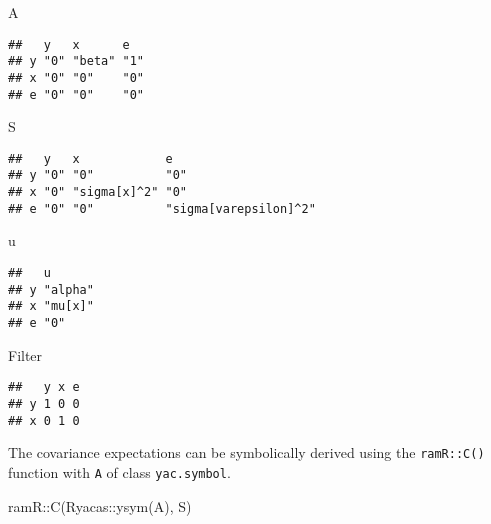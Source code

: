 \documentclass[
]{book}
\newenvironment{Shaded}{\begin{snugshade}}{\end{snugshade}}
\newcommand{\FunctionTok}[1]{\textcolor[rgb]{0.00,0.00,0.00}{#1}}
\newcommand{\NormalTok}[1]{#1}
\newcommand{\SpecialCharTok}[1]{\textcolor[rgb]{0.00,0.00,0.00}{#1}}
\theoremstyle{definition}
\theoremstyle{definition}
\theoremstyle{definition}
\theoremstyle{remark}
\begin{document}
\begin{Shaded}
\begin{Highlighting}[]
\NormalTok{A}
\end{Highlighting}
\end{Shaded}

\begin{verbatim}
##   y   x      e  
## y "0" "beta" "1"
## x "0" "0"    "0"
## e "0" "0"    "0"
\end{verbatim}

\begin{Shaded}
\begin{Highlighting}[]
\NormalTok{S}
\end{Highlighting}
\end{Shaded}

\begin{verbatim}
##   y   x            e                    
## y "0" "0"          "0"                  
## x "0" "sigma[x]^2" "0"                  
## e "0" "0"          "sigma[varepsilon]^2"
\end{verbatim}

\begin{Shaded}
\begin{Highlighting}[]
\NormalTok{u}
\end{Highlighting}
\end{Shaded}

\begin{verbatim}
##   u      
## y "alpha"
## x "mu[x]"
## e "0"
\end{verbatim}

\begin{Shaded}
\begin{Highlighting}[]
\NormalTok{Filter}
\end{Highlighting}
\end{Shaded}

\begin{verbatim}
##   y x e
## y 1 0 0
## x 0 1 0
\end{verbatim}

The covariance expectations
can be symbolically derived using the \texttt{ramR::C()} function
with \texttt{A} of class \texttt{yac.symbol}.

\begin{Shaded}
\begin{Highlighting}[]
\NormalTok{ramR}\SpecialCharTok{::}\FunctionTok{C}\NormalTok{(Ryacas}\SpecialCharTok{::}\FunctionTok{ysym}\NormalTok{(A), S)}
\end{Highlighting}
\end{Shaded}
\end{document}
